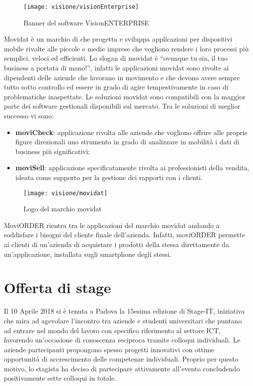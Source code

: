 \begin{figure}[!h] 
    \centering 
    \texttt{[image: visione/visionEnterprise]} 
    \caption{Banner del software VisionENTERPRISE}
\end{figure}

Movidat è un marchio di \visione{} che progetta e sviluppa applicazioni per dispositivi mobile rivolte alle piccole e medie imprese che vogliono rendere i loro processi più semplici, veloci ed efficienti. Lo slogan di movidat è ``ovunque tu sia, il tuo business a portata di mano!'', infatti le applicazioni movidat sono rivolte ai dipendenti delle aziende che lavorano in movimento e che devono avere sempre tutto sotto controllo ed essere in grado di agire tempestivamente in caso di problematiche inaspettate. Le soluzioni movidat sono compatibili con la maggior parte dei software gestionali disponibili sul mercato. Tra le soluzioni di meglior successo vi sono:
\begin{itemize}
	\item \textbf{moviCheck}: applicazione rivolta alle aziende che vogliono offrire alle proprie figure direzionali uno strumento in grado di analizzare in mobilità i dati di business più significativi;
	\item \textbf{moviSell}: applicazione specificatamente rivolta ai professionisti della vendita, ideata come supporto per la gestione dei rapporti con i clienti.
\end{itemize}

\begin{figure}[!h] 
    \centering 
    \texttt{[image: visione/movidat]} 
    \caption{Logo del marchio movidat}
\end{figure}

MoviORDER rientra tra le applicazioni del marchio movidat andando a soddisfare i bisogni del cliente finale dell'azienda. Infatti, moviORDER permette ai clienti di un'azienda di acquistare i prodotti della stessa direttamente da un'applicazione, installata sugli smartphone degli stessi.

\section{Offerta di stage}

Il 10 Aprile 2018 si è tenuta a Padova la 15esima edizione di Stage-IT, iniziativa che mira ad agevolare l'incontro tra aziende e studenti universitari che puntano ad entrare nel mondo del lavoro con specifico riferimento al settore ICT, favorendo un'occasione di conoscenza reciproca tramite colloqui individuali. Le aziende partecipanti propongono spesso progetti innovativi con ottime opportunità di accrescimento delle competenze individuali. Proprio per questo motivo, lo stagista ha deciso di partecipare attivamente all'evento concludendo positivamente sette colloqui in totale. 


